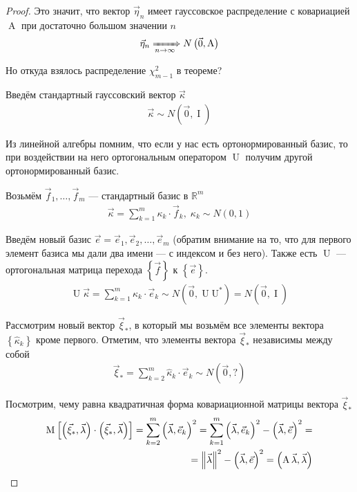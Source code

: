 \begin{proof}
  Это значит, что вектор $\vec{\eta}_n$ имеет гауссовское распределение с
  ковариацией $\operatorname{A}$ при достаточно большом значении $n$
  \begin{align*}
      \vec{\eta}_n \xRightarrow[n\to\infty]{} N\left( \vec{0}, \operatorname{A} \right)
  \end{align*}

  Но откуда взялось распределение $\chi_{m-1}^2$ в теореме?

  Введём стандартный гауссовский вектор $\vec{\kappa}$
  \begin{align*}
      \vec{\kappa} \sim N\left( \vec{0}, \operatorname{I} \right)
  \end{align*}

  Из линейной алгебры помним, что если у нас есть ортонормированный базис,
  то при воздействии на него ортогональным оператором $\operatorname{U}$
  получим другой ортонормированный базис.

  Возьмём $\vec{f}_1, \dots, \vec{f}_m$ --- стандартный базис в
  $\mathbb{R}^m$
  \begin{align*}
      \vec{\kappa} = \sum_{k=1}^{m} \kappa_k \cdot \vec{f}_k,\;
      \kappa_k \sim N\left( 0, 1 \right)
  \end{align*}

  Введём новый базис $\vec{e} = \vec{e}_1, \vec{e}_2, \dots, \vec{e}_m$
  (обратим внимание на то, что для первого элемент базиса мы дали два имени
  --- с индексом и без него). Также есть $\operatorname{U}$ --- ортогональная
  матрица перехода $\left\{ \vec{f} \right\}$ к $\left\{ \vec{e} \right\}$.
  \begin{align*}
      \operatorname{U} \vec{\kappa}
      = \sum_{k=1}^{m} \hat{\kappa}_k \cdot \vec{e}_k
      \sim N\left( \vec{0}, \operatorname{U} \operatorname{U^*} \right)
      = N\left( \vec{0}, \operatorname{I} \right)
  \end{align*}

  Рассмотрим новый вектор $\vec{\xi}_*$, в который мы возьмём все элементы
  вектора $\left\{ \hat{\kappa}_k \right\}$ кроме первого. Отметим, что
  элементы вектора $\vec{\xi}_*$ независимы между собой
  \begin{align*}
      \vec{\xi}_* = \sum_{k=2}^{m} \hat{\kappa}_k \cdot \vec{e}_k
      \sim N\left( \vec{0}, ? \right)
  \end{align*}

  Посмотрим, чему равна квадратичная форма ковариационной матрицы вектора
  $\vec{\xi}_*$
  \begin{align*}
      \operatorname{M}_{} \left[ \left( \vec{\xi}_*, \vec{\lambda} \right) \cdot
      \left( \vec{\xi}_*, \vec{\lambda} \right) \right]
      = \sum_{k=2}^{m}\left( \vec{\lambda}, \vec{e}_k \right)^2
      = \sum_{k=1}^{m}\left( \vec{\lambda}, \vec{e}_k \right)^2
      - \left( \vec{\lambda}, \vec{e} \right)^2 = \\
      = \left\| \vec{\lambda} \right\|^2
      - \left( \vec{\lambda}, \vec{e} \right)^2
      = \left( \operatorname{A} \vec{\lambda}, \vec{\lambda} \right)
  \end{align*}


\end{proof}
